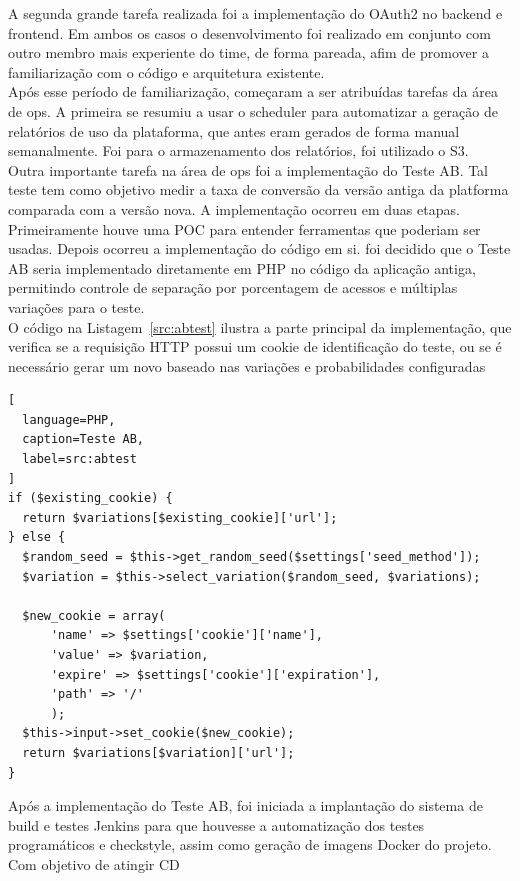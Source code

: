 A segunda grande tarefa realizada foi a implementação do \gls{OAuth2} no \gls{backend} e \gls{frontend}. Em ambos os casos o desenvolvimento foi realizado em conjunto com outro membro mais experiente do time, de forma pareada, afim de promover a familiarização com o código e arquitetura existente.\\

Após esse período de familiarização, começaram a ser atribuídas tarefas da área de \gls{ops}. A primeira se resumiu a usar o \gls{scheduler} para automatizar a geração de relatórios de uso da plataforma, que antes eram gerados de forma manual semanalmente. Foi para o armazenamento dos relatórios, foi utilizado o \gls{S3}.\\

Outra importante tarefa na área de \gls{ops} foi a implementação do \gls{Teste AB}. Tal teste tem como objetivo medir a taxa de conversão da versão antiga da platforma comparada com a versão nova. A implementação ocorreu em duas etapas. Primeiramente houve uma \gls{POC} para entender ferramentas que poderiam ser usadas. Depois ocorreu a implementação do código em si. foi decidido que o \gls{Teste AB} seria implementado diretamente em \gls{PHP} no código da aplicação antiga, permitindo controle de separação por porcentagem de acessos e múltiplas variações para o teste.\\

O código na Listagem~\ref{src:abtest} ilustra a parte principal da implementação, que verifica se a requisição \gls{HTTP} possui um \gls{cookie} de identificação do teste, ou se é necessário gerar um novo baseado nas variações e probabilidades configuradas\\

\begin{lstlisting}[
  language=PHP,
  caption=Teste AB,
  label=src:abtest
]
if ($existing_cookie) {
  return $variations[$existing_cookie]['url'];
} else {
  $random_seed = $this->get_random_seed($settings['seed_method']);
  $variation = $this->select_variation($random_seed, $variations);

  $new_cookie = array(
      'name' => $settings['cookie']['name'],
      'value' => $variation,
      'expire' => $settings['cookie']['expiration'],
      'path' => '/'
      );
  $this->input->set_cookie($new_cookie);
  return $variations[$variation]['url'];
}
\end{lstlisting}

Após a implementação do \gls{Teste AB}, foi iniciada a implantação do sistema de build e testes \gls{Jenkins} para que houvesse a automatização dos testes programáticos e \gls{checkstyle}, assim como geração de imagens \gls{Docker} do projeto. Com objetivo de atingir \gls{CD}\\

